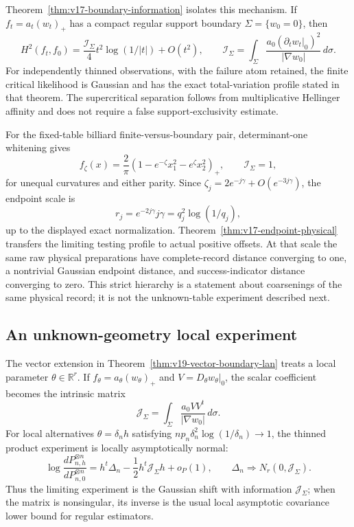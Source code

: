 Theorem~\ref{thm:v17-boundary-information} isolates this mechanism.  If
$f_t=a_t(w_t)_+$ has a compact regular support boundary
$\Sigma=\{w_0=0\}$, then
\begin{equation}\label{eq:v19-intro-scalar-boundary-information}
 H^2(f_t,f_0)=\frac{\mathcal I_\Sigma}{4}t^2\log(1/|t|)+O(t^2),
 \qquad
 \mathcal I_\Sigma=
 \int_\Sigma\frac{a_0(\partial_tw_t|_0)^2}{|\nabla w_0|}\,d\sigma.
\end{equation}
For independently thinned observations, with the failure atom retained,
the finite critical likelihood is Gaussian and has the exact total-variation
profile stated in that theorem.  The supercritical separation follows from
multiplicative Hellinger affinity and does not require a false
support-exclusivity estimate.

For the fixed-table billiard finite-versus-boundary pair, determinant-one
whitening gives
\[
 f_\zeta(x)=\frac2\pi
 (1-e^{-\zeta}x_1^2-e^{\zeta}x_2^2)_+,
 \qquad \mathcal I_\Sigma=1,
\]
for unequal curvatures and either parity.  Since
$\zeta_j=2e^{-j\gamma}+O(e^{-3j\gamma})$, the endpoint scale is
\[
 r_j=e^{-2j\gamma}j\gamma
      =q_j^2\log(1/q_j),
\]
up to the displayed exact normalization.  Theorem~\ref{thm:v17-endpoint-physical}
transfers the limiting testing profile to actual positive offsets.  At that
scale the same raw physical preparations have complete-record distance
converging to one, a nontrivial Gaussian endpoint distance, and
success-indicator distance converging to zero.  This strict hierarchy is a
statement about coarsenings of the same physical record; it is not the
unknown-table experiment described next.

\subsection{An unknown-geometry local experiment}
The vector extension in Theorem~\ref{thm:v19-vector-boundary-lan} treats a
local parameter $\theta\in\mathbb R^r$.  If
$f_\theta=a_\theta(w_\theta)_+$ and
$V=D_\theta w_\theta|_0$, the scalar coefficient becomes the intrinsic
matrix
\begin{equation}\label{eq:v19-intro-information-matrix}
 \mathcal J_\Sigma=
 \int_\Sigma\frac{a_0VV^t}{|\nabla w_0|}\,d\sigma.
\end{equation}
For local alternatives $\theta=\delta_nh$ satisfying
$n p_n\delta_n^2\log(1/\delta_n)\to1$, the thinned product experiment is
locally asymptotically normal:
\begin{equation}\label{eq:v19-intro-lan}
 \log\frac{dP_{n,h}^{\otimes n}}{dP_{n,0}^{\otimes n}}
 =h^t\Delta_n-\frac12h^t\mathcal J_\Sigma h+o_P(1),
 \qquad
 \Delta_n\Rightarrow N_r(0,\mathcal J_\Sigma).
\end{equation}
Thus the limiting experiment is the Gaussian shift with information
$\mathcal J_\Sigma$; when the matrix is nonsingular, its inverse is the
usual local asymptotic covariance lower bound for regular estimators.

